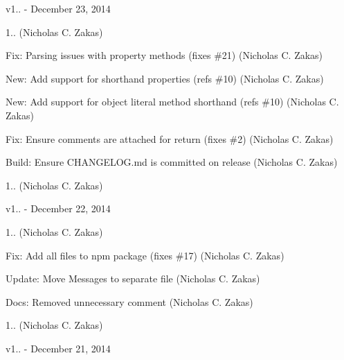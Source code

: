 v1.. -\/ December 23, 2014


\begin{DoxyItemize}
\item 1.. (Nicholas C. Zakas)
\item Fix\+: Parsing issues with property methods (fixes \#21) (Nicholas C. Zakas)
\item New\+: Add support for shorthand properties (refs \#10) (Nicholas C. Zakas)
\item New\+: Add support for object literal method shorthand (refs \#10) (Nicholas C. Zakas)
\item Fix\+: Ensure comments are attached for return (fixes \#2) (Nicholas C. Zakas)
\item Build\+: Ensure CHANGELOG.\+md is committed on release (Nicholas C. Zakas)
\item 1.. (Nicholas C. Zakas)
\end{DoxyItemize}

v1.. -\/ December 22, 2014


\begin{DoxyItemize}
\item 1.. (Nicholas C. Zakas)
\item Fix\+: Add all files to npm package (fixes \#17) (Nicholas C. Zakas)
\item Update\+: Move Messages to separate file (Nicholas C. Zakas)
\item Docs\+: Removed unnecessary comment (Nicholas C. Zakas)
\item 1.. (Nicholas C. Zakas)
\end{DoxyItemize}

v1.. -\/ December 21, 2014



